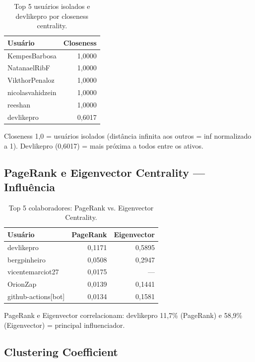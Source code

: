 \documentclass[12pt]{article}
\begin{document}
\begin{table}[H]
  \centering
  \caption{Top 5 usuários isolados e devlikepro por closeness centrality.}
  \label{tab:closeness}
  \begin{tabular}{l|r}
    \toprule
    \textbf{Usuário} & \textbf{Closeness} \\
    \midrule
    KempesBarbosa      & 1,0000 \\
    NatanaelRibF       & 1,0000 \\
    VikthorPenaloz     & 1,0000 \\
    nicolasvahidzein   & 1,0000 \\
    reeshan            & 1,0000 \\
    devlikepro         & 0,6017 \\
    \bottomrule
  \end{tabular}
\end{table}

Closeness 1,0 = usuários isolados (distância infinita aos outros = inf normalizado a 1). Devlikepro (0,6017) = mais próxima a todos entre os ativos.

\subsection{PageRank e Eigenvector Centrality --- Influência}

\begin{table}[H]
  \centering
  \caption{Top 5 colaboradores: PageRank vs. Eigenvector Centrality.}
  \label{tab:centrality}
  \begin{tabular}{l|r|r}
    \toprule
    \textbf{Usuário} & \textbf{PageRank} & \textbf{Eigenvector} \\
    \midrule
    devlikepro         & 0,1171 & 0,5895 \\
    bergpinheiro       & 0,0508 & 0,2947 \\
    vicentemarciot27   & 0,0175 & --- \\
    OrionZap           & 0,0139 & 0,1441 \\
    github-actions[bot] & 0,0134 & 0,1581 \\
    \bottomrule
  \end{tabular}
\end{table}

PageRank e Eigenvector correlacionam: devlikepro 11,7\% (PageRank) e 58,9\% (Eigenvector) = principal influenciador.

\subsection{Clustering Coefficient}
\end{document}
